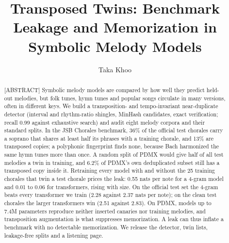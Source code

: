 \documentclass[ProofPDF]{./Styles/Jnls-Template-V3}
\begin{document}
\def\MSFirstPage{\pageref{startPage_Label}}
\def\MSLastPage{\pageref{endPage_Label}}
\graphicspath{{./figures/}}
\label{startPage_Label}
\title{Transposed Twins: Benchmark Leakage and Memorization in Symbolic Melody Models}


\author[1]{Taka Khoo}


\begin{history}
\end{history}

\begin{abstract}[ABSTRACT]
Symbolic melody models are compared by how well they predict held-out melodies, but folk tunes, hymn tunes and popular songs circulate in many versions, often in different keys. We build a transposition- and tempo-invariant near-duplicate detector (interval and rhythm-ratio shingles, MinHash candidates, exact verification; recall 0.99 against exhaustive search) and audit eight melody corpora and their standard splits. In the JSB Chorales benchmark, 36\% of the official test chorales carry a soprano that shares at least half its phrases with a training chorale, and 13\% are transposed copies; a polyphonic fingerprint finds none, because Bach harmonized the same hymn tunes more than once. A random split of PDMX would give half of all test melodies a twin in training, and 6.2\% of PDMX's own deduplicated subset still has a transposed copy inside it. Retraining every model with and without the 25 training chorales that twin a test chorale prices the leak: 0.55 nats per note for a 4-gram model and 0.01 to 0.06 for transformers, rising with size. On the official test set the 4-gram beats every transformer we train (2.28 against 2.37 nats per note); on the clean test chorales the larger transformers win (2.51 against 2.83). On PDMX, models up to 7.4M parameters reproduce neither inserted canaries nor training melodies, and transposition augmentation is what suppresses memorization. A leak can thus inflate a benchmark with no detectable memorization. We release the detector, twin lists, leakage-free splits and a listening page.
\end{abstract}
\end{document}
